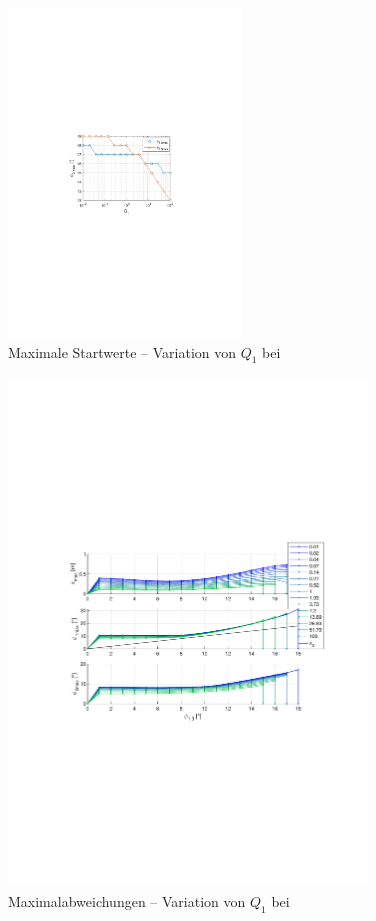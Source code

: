\begin{figure}[htbp]
	\centering
		\includegraphics[width=0.55\textwidth]{Bilder/QRVariation/ap4/q1 phi12.pdf}
		\caption{Maximale Startwerte -- Variation von $Q_1$ bei \apv}
	\label{fig:qrap4q1}
\end{figure}

\begin{figure}[htbp]
	\centering
		\includegraphics[width=0.85\textwidth]{Bilder/QRVariation/ap4/q1 phi1 m.pdf}
	\caption{Maximalabweichungen -- Variation von $Q_1$ bei \apv}
	\label{fig:qrap4q1m}
\end{figure}

